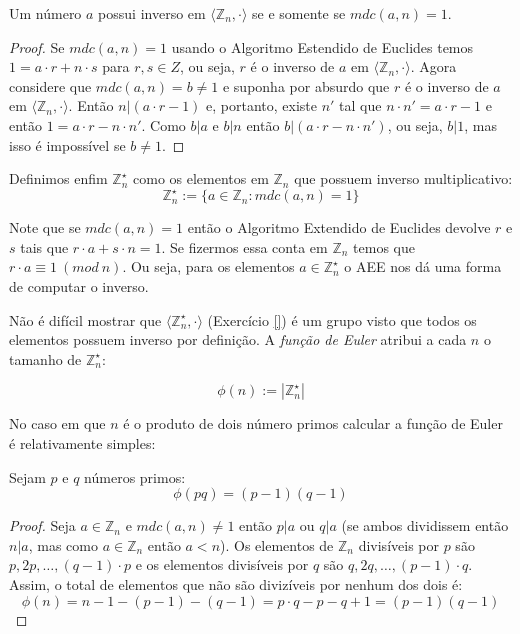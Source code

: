 \begin{proposition}
Um número $a$ possui inverso em $\langle \mathbb{Z}_n, \cdot \rangle$ se e somente se $mdc(a,n) = 1$.
\end{proposition}
\begin{proof}
  Se $mdc(a, n) = 1$ usando o Algoritmo Estendido de Euclides temos $1 = a \cdot r + n \cdot s$ para $r, s \in Z$, ou seja, $r$ é o inverso de $a$ em $\langle \mathbb{Z}_n, \cdot \rangle$.
Agora considere que $mdc(a, n) = b \neq 1$ e suponha por absurdo que $r$ é o
inverso de $a$ em $\langle \mathbb{Z}_n , \cdot \rangle$. 
Então $n|(a \cdot r - 1)$ e, portanto, existe $n'$ tal que $n \cdot n' = a \cdot r - 1$ e então $1 = a \cdot r - n \cdot n'$. 
Como $b|a$ e $b|n$ então $b|(a \cdot r - n \cdot n')$, ou seja, $b|1$, mas isso é impossível se $b \neq 1$.
\end{proof}


Definimos enfim $\mathbb{Z}_n^\star$ como os elementos em $\mathbb{Z}_n$ que possuem inverso multiplicativo:
\begin{displaymath}
  \mathbb{Z}_n^\star := \{a \in \mathbb{Z}_n : mdc(a,n) = 1\}
\end{displaymath}

Note que se $mdc(a,n) = 1$ então o Algoritmo Extendido de Euclides devolve $r$ e $s$ tais que $r \cdot a + s \cdot n = 1$.
Se fizermos essa conta em $\mathbb{Z}_n$ temos que $r \cdot a \equiv 1\ (mod\ n)$.
Ou seja, para os elementos $a \in \mathbb{Z}_n^\star$ o AEE nos dá uma forma de computar o inverso.
 
Não é difícil mostrar que $\langle \mathbb{Z}_n^\star, \cdot \rangle$ (Exercício \ref{}) é um grupo visto que todos os elementos possuem inverso por definição.
A {\em função de Euler} atribui a cada $n$ o tamanho de $\mathbb{Z}_n^\star$:

\begin{displaymath}
  \phi(n) := |\mathbb{Z}_n^\star|
\end{displaymath}

No caso em que $n$ é o produto de dois número primos calcular a função de Euler é relativamente simples:

\begin{proposition}
Sejam $p$ e $q$ números primos:  
\begin{displaymath}
  \phi(pq) = (p - 1)(q - 1)
\end{displaymath}
\end{proposition}
\begin{proof}
Seja $a \in \mathbb{Z}_n$ e $mdc(a, n) \neq 1$ então $p|a$ ou $q|a$ (se ambos dividissem então $n|a$, mas como $a \in \mathbb{Z}_n$ então $a < n$).
Os elementos de $\mathbb{Z}_n$ divisíveis por $p$ são $p, 2p, \dots , (q - 1) \cdot p$ e os elementos divisíveis por $q$ são $q, 2q, \dots , (p - 1) \cdot q$. 
Assim, o total de elementos que não são divizíveis por nenhum dos dois é:
\begin{displaymath}
  \phi(n) = n - 1 - (p - 1) - (q - 1) = p \cdot q - p - q + 1 = (p - 1)(q - 1)
\end{displaymath}


\end{proof}

